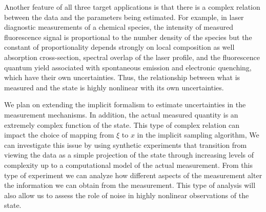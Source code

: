 \documentclass[11pt]{article}
\newcommand{\MarginPar}[1]{\marginpar{%
\vskip-\baselineskip %
\raggedright\tiny\sffamily
\hrule\smallskip{\color{red}#1}\par\smallskip\hrule}}
\begin{document}
Another feature of all three target applications is that there is
a complex relation between the data and the parameters being estimated.
For example, in laser diagnostic measurements of a chemical species,
the intensity of measured fluorescence signal is
proportional to the number density of the species but the constant of proportionality depends strongly on
local
composition as well
absorption cross-section, spectral overlap of the laser profile, 
and the fluorescence quantum yield associated with spontaneous emission and electronic quenching, which
have their own uncertainties.
Thus, the relationship between what is measured and the state is highly nonlinear with its own uncertainties.

We plan on extending the implicit formalism to estimate uncertainties in the measurement mechanisms.
In addition, the actual measured quantity is
an extremely complex function of the state.
This type of complex relation can impact the choice of mapping from $\xi$ to $x$ in the implicit sampling algorithm,
We can investigate
this issue by using synthetic experiments that transition from viewing the data
as a simple projection of the state through increasing levels of complexity up to
a computational model of the actual measurement.  From this type of experiment we can 
analyze how different aspects of the measurement alter the information we can
obtain from the measurement. This type of analysis will also allow us to assess the
role of noise in highly nonlinear observations of the state.
\end{document}
